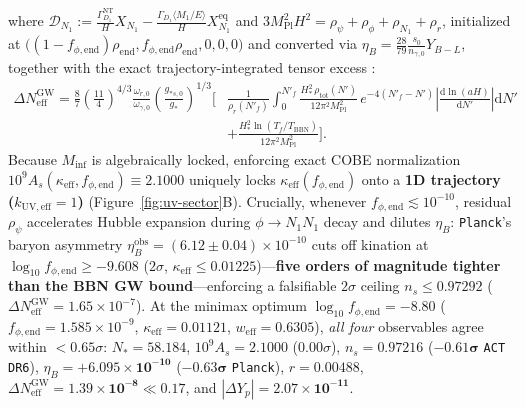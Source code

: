 \documentclass[11pt,a4paper]{article}
\begin{document}
where $\mathcal{D}_{N_1} := \frac{\Gamma_{D_1}^{\mathrm{NT}}}{H}X_{N_1} - \frac{\Gamma_{D_1}\langle M_1/E\rangle}{H}X_{N_1}^{\mathrm{eq}}$ and $3M_{\mathrm{Pl}}^2 H^2 = \rho_\psi + \rho_\phi + \rho_{N_1} + \rho_r$, initialized at $\bigl((1-f_{\phi,\mathrm{end}})\rho_{\mathrm{end}}, f_{\phi,\mathrm{end}}\rho_{\mathrm{end}}, 0, 0, 0\bigr)$ and converted via $\eta_B = \frac{28}{79}\frac{s_0}{n_{\gamma,0}}Y_{B-L}$, together with the exact trajectory-integrated tensor excess \cite{FigueroaTanin2019}:
\begin{equation}
\begin{aligned}
  \Delta N_{\mathrm{eff}}^{\mathrm{GW}} = \frac{8}{7}\left(\frac{11}{4}\right)^{\!4/3}\frac{\omega_{r,0}}{\omega_{\gamma,0}}\left(\frac{g_{*s,0}}{g_*}\right)^{\!1/3}\Biggl[
  &\frac{1}{\rho_r(N'_f)}\int_0^{N'_f}\frac{H_*^2\,\rho_{\mathrm{tot}}(N')}{12\pi^2 M_{\mathrm{Pl}}^2}\,e^{-4(N'_f - N')}\left|\frac{\mathrm{d}\ln(aH)}{\mathrm{d}N'}\right|\mathrm{d}N' \\
  &+ \frac{H_*^2\ln(T_f/T_{\mathrm{BBN}})}{12\pi^2 M_{\mathrm{Pl}}^2}\Biggr].
\end{aligned}
\label{eq:dneff-gw}
\end{equation}
Because $M_{\mathrm{inf}}$ is algebraically locked, enforcing exact COBE normalization $10^9 A_s(\kappa_{\mathrm{eff}}, f_{\phi,\mathrm{end}}) \equiv 2.1000$ uniquely locks $\kappa_{\mathrm{eff}}(f_{\phi,\mathrm{end}})$ onto a \textbf{1D trajectory ($k_{\mathrm{UV,eff}} = 1$)} (Figure~\ref{fig:uv-sector}B). Crucially, whenever $f_{\phi,\mathrm{end}} \lesssim 10^{-10}$, residual $\rho_\psi$ accelerates Hubble expansion during $\phi \to N_1 N_1$ decay and dilutes $\eta_B$: \texttt{Planck}'s baryon asymmetry $\eta_B^{\mathrm{obs}} = (6.12 \pm 0.04)\times 10^{-10}$ cuts off kination at $\log_{10} f_{\phi,\mathrm{end}} \ge \mathbf{-9.608}$ ($2\sigma$, $\kappa_{\mathrm{eff}} \le 0.01225$)—\textbf{five orders of magnitude tighter than the BBN GW bound}—enforcing a falsifiable $2\sigma$ ceiling $n_s \le \mathbf{0.97292}$ ($\Delta N_{\mathrm{eff}}^{\mathrm{GW}} = 1.65\times 10^{-7}$). At the minimax optimum $\log_{10} f_{\phi,\mathrm{end}} = -8.80$ ($f_{\phi,\mathrm{end}} = 1.585\times 10^{-9}$, $\kappa_{\mathrm{eff}} = 0.01121$, $w_{\mathrm{eff}} = 0.6305$), \emph{all four} observables agree within $<0.65\sigma$: $N_* = 58.184$, $10^9 A_s = \mathbf{2.1000}$ ($0.00\sigma$), $n_s = \mathbf{0.97216}$ ($\mathbf{-0.61\sigma}$ {\upshape\texttt{ACT DR6}}), $\eta_B = \mathbf{+6.095\times 10^{-10}}$ ($\mathbf{-0.63\sigma}$ \texttt{Planck}), $r = \mathbf{0.00488}$, $\Delta N_{\mathrm{eff}}^{\mathrm{GW}} = \mathbf{1.39\times 10^{-8}} \ll 0.17$, and $|\Delta Y_p| = \mathbf{2.07\times 10^{-11}}$.
\end{document}
